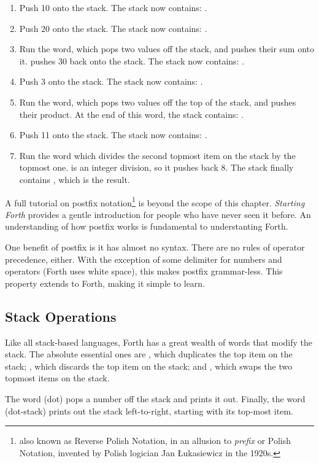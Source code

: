 \begin{enumerate}
\item Push 10 onto the stack. The stack now contains: .
\item Push 20 onto the stack. The stack now contains: .
\item Run the \fw{+} word, which pops two values off the stack, and pushes
  their sum onto it. \fw{+} pushes 30 back onto the stack. The stack now
  contains: .
\item Push 3 onto the stack. The stack now contains: .
\item Run the \fw{*} word, which pops two values off the top of the stack, and
  pushes their product. At the end of this word, the stack contains:
  .
\item Push 11 onto the stack. The stack now contains: .
\item Run the \fw{/} word which divides the second topmost item on the stack by
  the topmost one. \fw{/} is an integer division, so it pushes back 8. The
  stack finally contains , which is the result.
\end{enumerate}

A full tutorial on postfix notation\footnote{also known as Reverse Polish
  Notation, in an allusion to {\em prefix\/} or Polish Notation, invented by
  Polish logician Jan Łukasiewicz in the 1920s.} is beyond the scope of this
chapter. {\em Starting Forth\/} provides a gentle introduction for people who
have never seen it before. An understanding of how postfix works is fundamental
to understanting Forth.

One benefit of postfix is it has almost no syntax. There are no rules of
operator precedence, either. With the exception of some delimiter for numbers
and operators (Forth uses white space), this makes postfix grammar-less. This
property extends to Forth, making it simple to learn.

\subsection{Stack Operations}

Like all stack-based languages, Forth has a great wealth of words that modify
the stack. The absolute essential ones are , which duplicates the top
item on the stack; , which discards the top item on the stack; and
, which swaps the two topmost items on the stack.

The word  (dot) pops a number off the stack and prints it out. Finally,
the word  (dot-stack) prints out the stack left-to-right, starting with
its top-most item.

